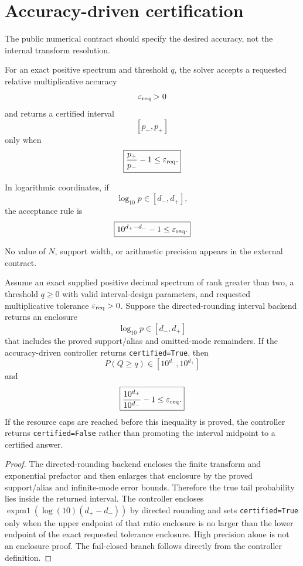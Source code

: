 \chapter{Accuracy-driven certification}\label{ch:accuracy}
\label{sec:final-5}

The public numerical contract should specify the desired accuracy, not the
internal transform resolution.

For an exact positive spectrum and threshold \(q\), the solver accepts a
requested relative multiplicative accuracy
\[
\varepsilon_{\rm req}>0
\]
and returns a certified interval
\[
[p_-,p_+]
\]
only when
\[
\boxed{
\frac{p_+}{p_-}-1
\le
\varepsilon_{\rm req}.
}
\]

In logarithmic coordinates, if
\[
\log_{10}p\in[d_-,d_+],
\]
the acceptance rule is
\[
\boxed{
10^{d_+-d_-}-1
\le
\varepsilon_{\rm req}.
}
\]

No value of \(N\), support width, or arithmetic precision appears in the
external contract.

\begin{theorem}\label{claim:final-5-1}
Assume an exact supplied positive decimal spectrum of rank greater than two,
a threshold \(q\ge0\) with valid interval-design parameters, and requested multiplicative tolerance
\(\varepsilon_{\rm req}>0\).  Suppose the directed-rounding interval backend
returns an enclosure
\[
\log_{10}p\in[d_-,d_+]
\]
that includes the proved support/alias and omitted-mode remainders.  If the
accuracy-driven controller returns \texttt{certified=True}, then
\[
\boxed{
P(Q\ge q)\in[10^{d_-},10^{d_+}]
}
\]
and
\[
\boxed{
\frac{10^{d_+}}{10^{d_-}}-1
\le
\varepsilon_{\rm req}.
}
\]
If the resource caps are reached before this inequality is proved, the
controller returns \texttt{certified=False} rather than promoting the interval
midpoint to a certified answer.
\end{theorem}

\begin{proof}
The directed-rounding backend encloses the finite transform and exponential
prefactor and then enlarges that enclosure by the proved support/alias and
infinite-mode error bounds.  Therefore the true tail probability lies inside
the returned interval.  The controller encloses
\(\operatorname{expm1}(\log(10)(d_+-d_-))\) by directed rounding and
sets \texttt{certified=True} only when the upper endpoint of that ratio
enclosure is no larger than the lower endpoint of the exact requested
tolerance enclosure.  High precision alone is not an enclosure proof.  The fail-closed branch follows directly from
the controller definition.
\end{proof}

